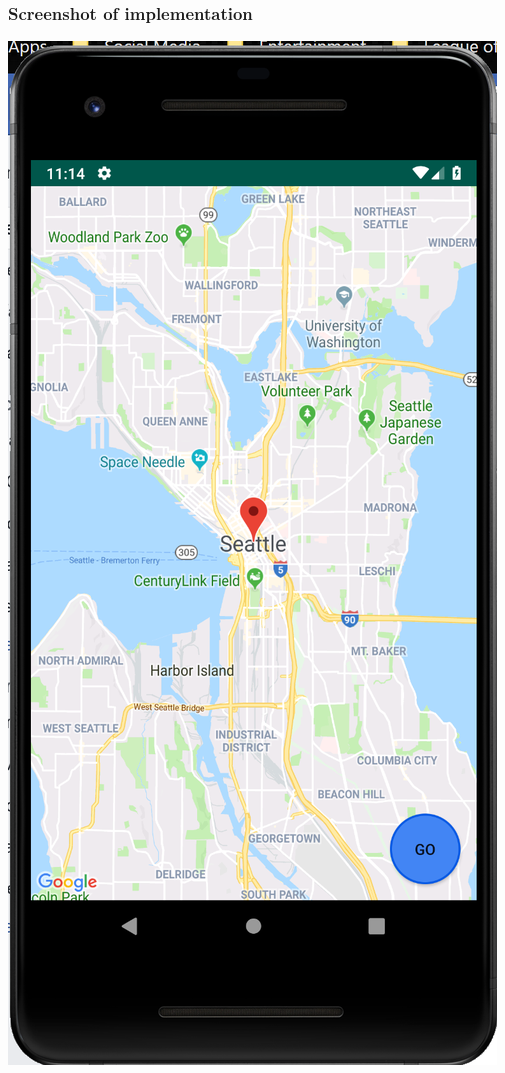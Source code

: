\documentclass[t,12pt,numbers,fleqn]{beamer}
\begin{document}
\begin{frame}
\frametitle{Screenshot of implementation}
\includegraphics[scale=0.135]{screenshot.png}
\end{frame}
\end{document}
